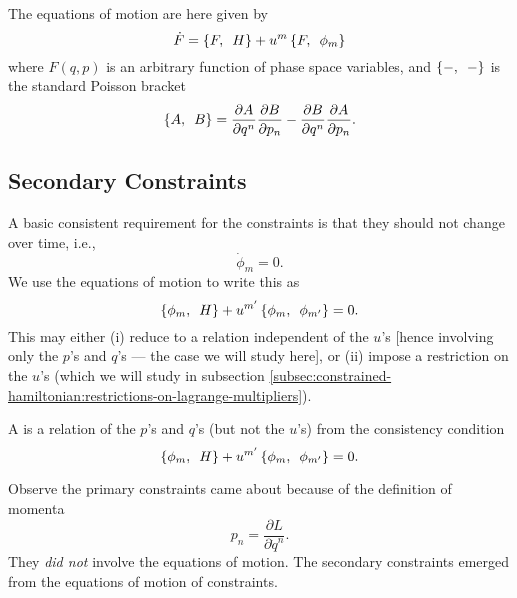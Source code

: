 \label{n:constrained-hamiltonian:poisson-bracket}
The equations of motion are here given by
\begin{equation}
  \dot{F} = \left\{F,\enspace H\right\} + u^{m}\left\{F,\enspace\phi_{m}\right\}
\end{equation}
where $F(q,p)$ is an arbitrary function of phase space variables, and
$\left\{-,\enspace-\right\}$ is the standard Poisson bracket
\begin{equation}
  \left\{A,\enspace B\right\} =
  \frac{\partial A}{\partial q^{n}}\frac{\partial B}{\partial p_{n}}
- \frac{\partial B}{\partial q^{n}}\frac{\partial A}{\partial p_{n}}.
\end{equation}

\subsection{Secondary Constraints}

A basic consistent requirement for the constraints is that they should
not change over time, i.e.,
\begin{equation}
  \dot{\phi}_{m}=0.
\end{equation}
We use the equations of motion 
to write this as
\begin{equation}
\left\{\phi_{m},\enspace H\right\} + u^{m'}\left\{\phi_{m},\enspace\phi_{m'}\right\}=0.
\end{equation}
This may either (i) reduce to a relation independent of the $u$'s [hence
  involving only the $p$'s and $q$'s --- the case we will study here],
or (ii) impose a restriction on the $u$'s (which we will study in
subsection \ref{subsec:constrained-hamiltonian:restrictions-on-lagrange-multipliers}).

\begin{defn}
A  is a relation of the $p$'s and $q$'s
(but not the $u$'s) from the consistency condition
\begin{equation}
\left\{\phi_{m},\enspace H\right\} + u^{m'}\left\{\phi_{m},\enspace\phi_{m'}\right\}=0.
\end{equation}
\end{defn}

\M
Observe the primary constraints came about because of the definition of
momenta
\begin{equation}
  p_{n} = \frac{\partial L}{\partial\dot{q}^{n}}.
\end{equation}
They \emph{did not} involve the equations of motion. The secondary
constraints emerged from the equations of motion of constraints.

